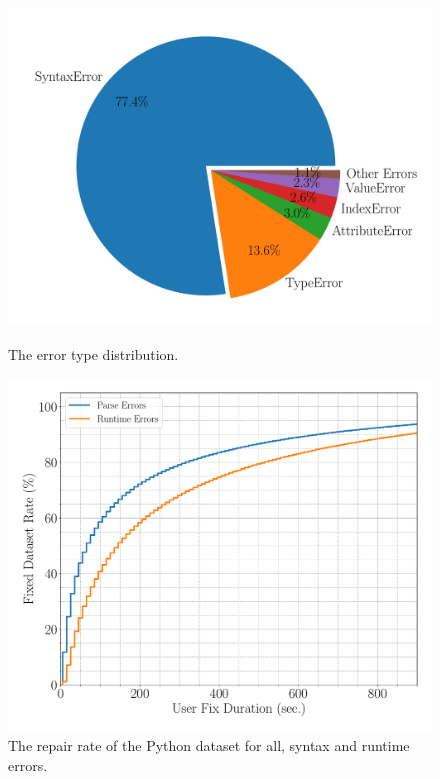 \begin{figure}[t]
  \centering
  \begin{minipage}[c]{0.49\linewidth}
    \centering
    \includegraphics[width=\linewidth]{error-pie.pdf}
    \caption{The error type distribution.}
    \label{fig:error-statistics}
  \end{minipage}
  \begin{minipage}[c]{0.5\linewidth}
      \centering
      \includegraphics[width=\linewidth]{fixed-rate.pdf}
      \caption{The repair rate of the Python dataset for all, syntax and runtime
      errors.}
      \label{fig:repair-rate}
  \end{minipage}
\end{figure}

